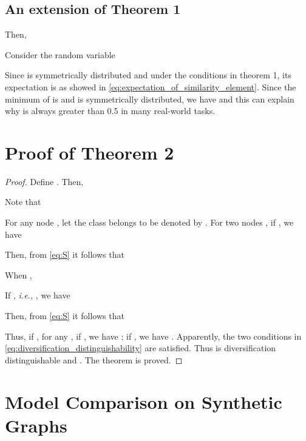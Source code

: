 \documentclass{article}
\newcommand\ie{\textit{i.e.,}}
\newcommand{\0}{{\boldsymbol{0}}}
\newcommand{\6}{{\partial}}
\newcommand{\8}{{\infty}}
\newcommand{\4}{{\nabla}}
\begin{document}
\subsection{An extension of Theorem 1}

Then,

Consider the random variable

Since  is symmetrically distributed and under the conditions in theorem 1, its expectation is  as showed in \eqref{eq:expectation_of_similarity_element}. Since the minimum of  is  and  is symmetrically distributed, we have  and this can explain why  is always greater than 0.5 in many real-world tasks.
\section{Proof of Theorem 2}
\label{appendix:proof_theorem2}
\begin{proof}
Define . 
Then,

Note that

For any node , let the class  belongs to be denoted by .
For two nodes , if , we have

Then, from \eqref{eq:S} it follows that

When ,  

If , \ie{} , we have

Then, from \eqref{eq:S} it follows that

Thus, if , for any , if , we have ; if , we have . Apparently, the two conditions in \eqref{eq:diversification_distinguishability} are satisfied.
Thus  is  diversification distinguishable and .
The theorem is proved.
\end{proof}


\section{Model Comparison on Synthetic Graphs}
\label{appendix:model_comparison_synthetic_datasets}
\end{document}

